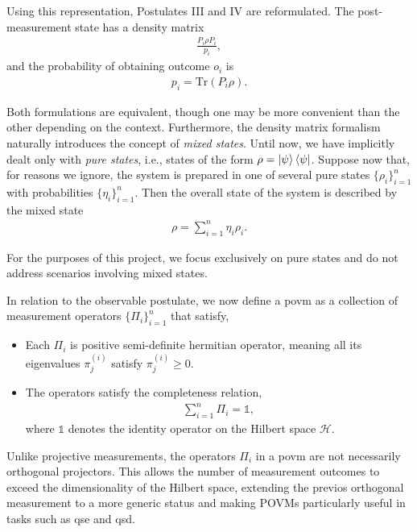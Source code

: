 \documentclass[12pt,letterpaper]{article}
\begin{document}

Using this representation, Postulates III and IV are reformulated. The post-measurement state has a density matrix
\begin{align*}
	\frac{P_i \rho P_i}{p_i},
\end{align*}
and the probability of obtaining outcome $o_i$ is
\begin{align*}
	p_i = \text{Tr}(P_i \rho).
\end{align*}

Both formulations are equivalent, though one may be more convenient than the other depending on the context. Furthermore, the density matrix formalism naturally introduces the concept of \emph{mixed states}. Until now, we have implicitly dealt only with \emph{pure states}, i.e., states of the form $\rho = \ket{\psi}\bra{\psi}$. Suppose now that, for reasons we ignore, the system is prepared in one of several pure states $\{\rho_i\}_{i=1}^n$ with probabilities $\{\eta_i\}_{i=1}^n$. Then the overall state of the system is described by the mixed state
\begin{align*}
	\rho = \sum_{i=1}^n \eta_i \rho_i.
\end{align*}

For the purposes of this project, we focus exclusively on pure states and do not address scenarios involving mixed states.

In relation to the observable postulate, we now define a \gls{povm} as a collection of measurement operators $\{\Pi_i\}_{i=1}^n$ that satisfy,
\begin{itemize}
	\item Each $\Pi_i$ is positive semi-definite hermitian operator, meaning all its eigenvalues $\pi_j^{(i)}$ satisfy $\pi_j^{(i)} \geq 0$.
	\item The operators satisfy the completeness relation,
\begin{align*}
	\sum_{i=1}^n \Pi_i = \mathds{1},
\end{align*}
where $\mathds{1}$ denotes the identity operator on the Hilbert space $\mathcal{H}$.
\end{itemize}

Unlike projective measurements, the operators $\Pi_i$ in a \gls{povm} are not necessarily orthogonal projectors. This allows the number of measurement outcomes to exceed the dimensionality of the Hilbert space, extending the previos orthogonal measurement to a more generic status and making POVMs particularly useful in tasks such as \gls{qse} and \gls{qsd}.
\end{document}

